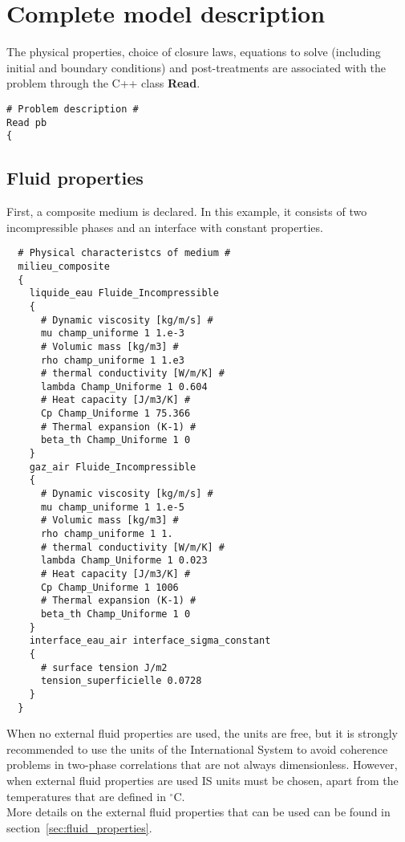 \section{Complete model description}\label{data:model}
The physical properties, choice of closure laws, equations to solve (including initial and boundary conditions) and post-treatments are associated with the problem through the C++ class \textbf{Read}. 
\begin{lstlisting}
# Problem description #
Read pb
{
\end{lstlisting}

\subsection{Fluid properties}

First, a composite medium is declared. 
In this example, it consists of two incompressible phases and an interface with constant properties.

\begin{lstlisting}
  # Physical characteristcs of medium #
  milieu_composite
  {
    liquide_eau Fluide_Incompressible
    {
      # Dynamic viscosity [kg/m/s] #
      mu champ_uniforme 1 1.e-3
      # Volumic mass [kg/m3] #
      rho champ_uniforme 1 1.e3
      # thermal conductivity [W/m/K] #
      lambda Champ_Uniforme 1 0.604
      # Heat capacity [J/m3/K] #
      Cp Champ_Uniforme 1 75.366
      # Thermal expansion (K-1) #
      beta_th Champ_Uniforme 1 0
    }
    gaz_air Fluide_Incompressible
    {
      # Dynamic viscosity [kg/m/s] #
      mu champ_uniforme 1 1.e-5
      # Volumic mass [kg/m3] #
      rho champ_uniforme 1 1.
      # thermal conductivity [W/m/K] #
      lambda Champ_Uniforme 1 0.023
      # Heat capacity [J/m3/K] #
      Cp Champ_Uniforme 1 1006
      # Thermal expansion (K-1) #
      beta_th Champ_Uniforme 1 0
    }
    interface_eau_air interface_sigma_constant
    {
      # surface tension J/m2
      tension_superficielle 0.0728
    }
  }
\end{lstlisting}

When no external fluid properties are used, the units are free, but it is strongly recommended to use the units of the International System to avoid coherence problems in two-phase correlations that are not always dimensionless.
However, when external fluid properties are used IS units must be chosen, apart from the temperatures that are defined in $^\circ$C.\\
More details on the external fluid properties that can be used can be found in section~\ref{sec:fluid_properties}.

